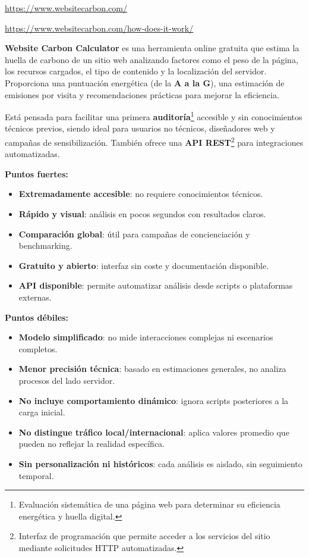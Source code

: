 \documentclass[12pt,a4paper]{report}
\begin{document}
\url{https://www.websitecarbon.com/}

\url{https://www.websitecarbon.com/how-does-it-work/}

\textbf{Website Carbon Calculator} es una herramienta online gratuita que estima la huella de carbono de un sitio web analizando factores como el peso de la página, los recursos cargados, el tipo de contenido y la localización del servidor. Proporciona una puntuación energética (de la \textbf{A a la G}), una estimación de emisiones por visita y recomendaciones prácticas para mejorar la eficiencia.

Está pensada para facilitar una primera \textbf{auditoría}\footnote{Evaluación
  sistemática de una página web para determinar su eficiencia energética y huella
  digital.} accesible y sin conocimientos técnicos previos, siendo ideal para
usuarios no técnicos, diseñadores web y campañas de sensibilización. También
ofrece una \textbf{API REST}\footnote{Interfaz de programación que permite
  acceder a los servicios del sitio mediante solicitudes HTTP automatizadas.}
para integraciones automatizadas.

\textbf{Puntos fuertes:}
\begin{itemize}
  \item \textbf{Extremadamente accesible}: no requiere conocimientos técnicos.
  \item \textbf{Rápido y visual}: análisis en pocos segundos con resultados claros.
  \item \textbf{Comparación global}: útil para campañas de concienciación y benchmarking.
  \item \textbf{Gratuito y abierto}: interfaz sin coste y documentación disponible.
  \item \textbf{API disponible}: permite automatizar análisis desde scripts o plataformas externas.
\end{itemize}

\textbf{Puntos débiles:}
\begin{itemize}
  \item \textbf{Modelo simplificado}: no mide interacciones complejas ni escenarios completos.
  \item \textbf{Menor precisión técnica}: basado en estimaciones generales, no analiza procesos del lado servidor.
  \item \textbf{No incluye comportamiento dinámico}: ignora scripts posteriores a la carga inicial.
  \item \textbf{No distingue tráfico local/internacional}: aplica valores promedio que pueden no reflejar la realidad específica.
  \item \textbf{Sin personalización ni históricos}: cada análisis es aislado, sin seguimiento temporal.
\end{itemize}
\end{document}
